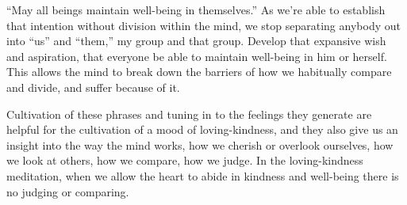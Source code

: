 “May all beings maintain well-being in themselves.” As we’re able to
establish that intention without division within the mind, we stop
separating anybody out into “us” and “them,” my group and that group.
Develop that expansive wish and aspiration, that everyone be able to
maintain well-being in him or herself. This allows the mind to break
down the barriers of how we habitually compare and divide, and suffer
because of it.

Cultivation of these phrases and tuning in to the feelings they generate
are helpful for the cultivation of a mood of loving-kindness, and they
also give us an insight into the way the mind works, how we cherish or
overlook ourselves, how we look at others, how we compare, how we judge.
In the loving-kindness meditation, when we allow the heart to abide in
kindness and well-being there is no judging or comparing.
